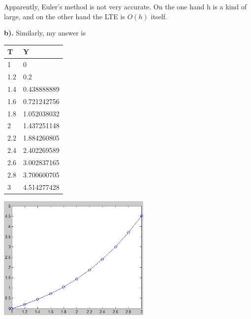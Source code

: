 \documentclass{article}
\begin{document}
Apparently, Euler's method is not very accurate. On the one hand h is a kind of large, and on the other hand the LTE is $O(h)$ itself.

\textbf{b).}
Similarly, my answer is
\begin{center}\begin{tabular}{ll}
\hline
T&Y\\
\hline
1&0\\
\hline
1.2&0.2\\
\hline
1.4&0.438888889\\
\hline
1.6&0.721242756\\
\hline
1.8&1.052038032\\
\hline
2&1.437251148\\
\hline
2.2&1.884260805\\
\hline
2.4&2.402269589\\
\hline
2.6&3.002837165\\
\hline
2.8&3.700600705\\
\hline
3&4.514277428\\
\hline
\end{tabular}
\end{center}
\begin{center}
  \includegraphics[width=7.5cm]{../pic/p8_3.png}\\
\end{center}
\end{document}
